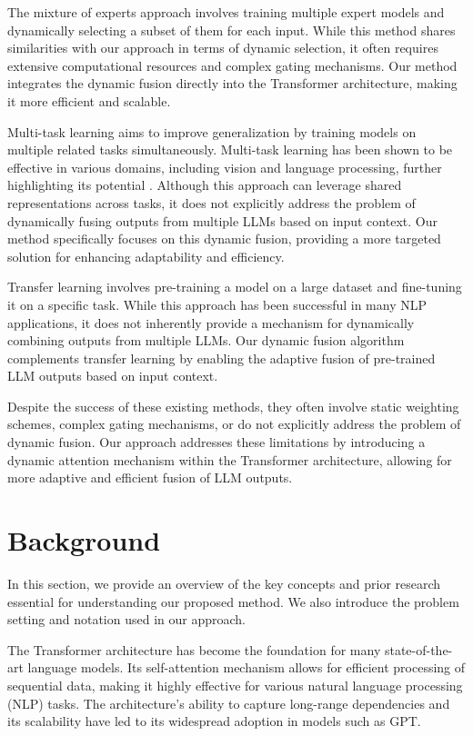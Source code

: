 \documentclass{article} %
\begin{document}
The mixture of experts approach \citep{Shazeer2017OutrageouslyLN, Chowdhury2023PatchlevelRI} involves training multiple expert models and dynamically selecting a subset of them for each input. While this method shares similarities with our approach in terms of dynamic selection, it often requires extensive computational resources and complex gating mechanisms. Our method integrates the dynamic fusion directly into the Transformer architecture, making it more efficient and scalable.

Multi-task learning \citep{Ponti2021MultiTaskLO} aims to improve generalization by training models on multiple related tasks simultaneously. Multi-task learning has been shown to be effective in various domains, including vision and language processing, further highlighting its potential \citep{Ruder2017AnOO}. Although this approach can leverage shared representations across tasks, it does not explicitly address the problem of dynamically fusing outputs from multiple LLMs based on input context. Our method specifically focuses on this dynamic fusion, providing a more targeted solution for enhancing adaptability and efficiency.

Transfer learning involves pre-training a model on a large dataset and fine-tuning it on a specific task. While this approach has been successful in many NLP applications, it does not inherently provide a mechanism for dynamically combining outputs from multiple LLMs. Our dynamic fusion algorithm complements transfer learning by enabling the adaptive fusion of pre-trained LLM outputs based on input context.

Despite the success of these existing methods, they often involve static weighting schemes, complex gating mechanisms, or do not explicitly address the problem of dynamic fusion. Our approach addresses these limitations by introducing a dynamic attention mechanism within the Transformer architecture, allowing for more adaptive and efficient fusion of LLM outputs.

\section{Background}
\label{sec:background}

In this section, we provide an overview of the key concepts and prior research essential for understanding our proposed method. We also introduce the problem setting and notation used in our approach.

The Transformer architecture has become the foundation for many state-of-the-art language models. Its self-attention mechanism allows for efficient processing of sequential data, making it highly effective for various natural language processing (NLP) tasks. The architecture's ability to capture long-range dependencies and its scalability have led to its widespread adoption in models such as GPT.
\end{document}
